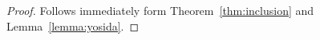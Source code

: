 \documentclass[a4paper,10pt,twoside]{amsbook}
\numberwithin{section}{chapter}
\numberwithin{equation}{chapter}
\theoremstyle{definition}
\newtheorem{cor}[prop]{Corollary}
\DeclareMathOperator{\dom}{dom}
\DeclarePairedDelimiter{\norm}{\lVert}{\rVert}
\DeclarePairedDelimiter{\dual}{\langle}{\rangle}
\begin{document}
\begin{proof}
Follows immediately form Theorem~\ref{thm:inclusion} and Lemma~\ref{lemma:yosida}.
\end{proof}
%
%
\end{document}
